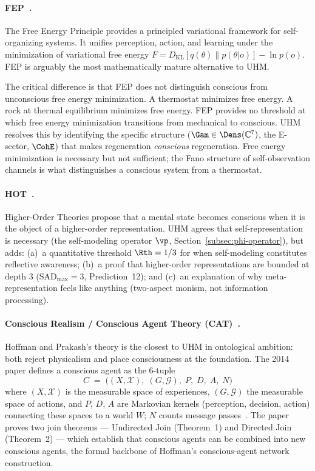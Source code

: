 \paragraph{FEP~\cite{friston2019}.}
The Free Energy Principle provides a principled variational framework for self-organizing
systems. It unifies perception, action, and learning under the minimization of variational
free energy $F = D_{\mathrm{KL}}[q(\theta) \| p(\theta | o)] - \ln p(o)$. FEP is arguably
the most mathematically mature alternative to UHM.

The critical difference is that FEP does not distinguish conscious from unconscious free
energy minimization. A thermostat minimizes free energy. A rock at thermal equilibrium
minimizes free energy. FEP provides no threshold at which free energy minimization
transitions from mechanical to conscious. UHM resolves this by identifying the specific
structure ($\Gam \in \Dens(\mathbb{C}^7)$, the E-sector, $\CohE$) that makes
regeneration \emph{conscious} regeneration. Free energy minimization is necessary but
not sufficient; the Fano structure of self-observation channels is what distinguishes
a conscious system from a thermostat.

\paragraph{HOT~\cite{lau2011}.}
Higher-Order Theories propose that a mental state becomes conscious when it is the object
of a higher-order representation. UHM agrees that self-representation is necessary
(the self-modeling operator $\vp$, Section~\ref{subsec:phi-operator}), but adds:
(a)~a quantitative threshold $\Rth = 1/3$ for when self-modeling constitutes reflective
awareness; (b)~a proof that higher-order representations are bounded at depth 3
($\mathrm{SAD}_{\max} = 3$, Prediction~12); and (c)~an explanation of why
meta-representation feels like anything (two-aspect monism, not information processing).

\paragraph{Conscious Realism / Conscious Agent Theory (CAT)~\cite{hoffman2014}.}
Hoffman and Prakash's theory is the closest to UHM in ontological ambition:
both reject physicalism and place consciousness at the foundation. The 2014
paper defines a conscious agent as the 6-tuple
\begin{equation*}
  C \;=\; \bigl((X, \mathcal{X}),\; (G, \mathcal{G}),\; P,\; D,\; A,\; N\bigr)
\end{equation*}
where $(X, \mathcal{X})$ is the measurable space of experiences,
$(G, \mathcal{G})$ the measurable space of actions, and $P$, $D$, $A$ are
Markovian kernels (perception, decision, action) connecting these spaces to a
world $W$; $N$ counts message passes~\cite{hoffman2014}. The paper proves two
join theorems --- Undirected Join (Theorem~1) and Directed Join (Theorem~2)
--- which establish that conscious agents can be combined into new conscious
agents, the formal backbone of Hoffman's conscious-agent network construction.

